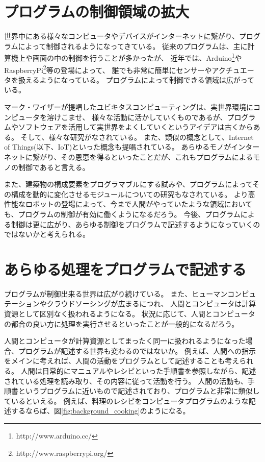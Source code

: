 \section{プログラムの制御領域の拡大}\label{ux30d7ux30edux30b0ux30e9ux30e0ux306eux5236ux5fa1ux9818ux57dfux306eux62e1ux5927}

世界中にある様々なコンピュータやデバイスがインターネットに繋がり、プログラムによって制御されるようになってきている。
従来のプログラムは、主に計算機上や画面の中の制御を行うことが多かったが、
近年では、Arduino\footnote{http://www.arduino.cc/}やRaspberryPi\footnote{http://www.raspberrypi.org/}等の登場によって、
誰でも非常に簡単にセンサーやアクチュエータを扱えるようになっている。
プログラムによって制御できる領域は広がっている。

マーク・ワイザーが提唱したユビキタスコンピューティング\cite{weiser1991computer}は、実世界環境にコンピュータを溶けこませ、
様々な活動に活かしていくものであるが、プログラムやソフトウェアを活用して実世界をよくしていくというアイデアは古くからある。
そして、様々な研究がなされている。 また、類似の概念として、Internet of
Things(以下、IoT)\cite{iot}といった概念も提唱されている。
あらゆるモノがインターネットに繋がり、その恩恵を得るといったことだが、これもプログラムによるモノの制御であると言える。

また、建築物の構成要素をプログラマブルにする試み\cite{squama}や、プログラムによってその構成を動的に変化させるモジュールについての研究もなされている。
より高性能なロボットの登場によって、今まで人間がやっていたような領域においても、プログラムの制御が有効に働くようになるだろう。
今後、プログラムによる制御は更に広がり、あらゆる制御をプログラムで記述するようになっていくのではないかと考えられる。

\section{あらゆる処理をプログラムで記述する}\label{ux3042ux3089ux3086ux308bux51e6ux7406ux3092ux30d7ux30edux30b0ux30e9ux30e0ux3067ux8a18ux8ff0ux3059ux308b}

プログラムが制御出来る世界は広がり続けている。
また、ヒューマンコンピュテーションやクラウドソーシングが広まるにつれ、
人間とコンピュータは計算資源として区別なく扱われるようになる。
状況に応じて、人間とコンピュータの都合の良い方に処理を実行させるといったことが一般的になるだろう。

人間とコンピュータが計算資源としてまったく同一に扱われるようになった場合、プログラムが記述する世界も変わるのではないか。
例えば、人間への指示をメインに考えれば、人間の活動をプログラムとして記述することも考えられる。
人間は日常的にマニュアルやレシピといった手順書を参照しながら、記述されている処理を読み取り、その内容に従って活動を行う。
人間の活動も、手順書というプログラムに近いもので記述されており、プログラムと非常に類似しているといえる。
例えば、料理のレシピをコンピュータプログラムのような記述するならば、図\ref{fig:background_cooking}のようになる。


